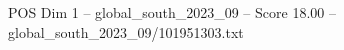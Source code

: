 \begin{textsample}{POS Dim 1 – global\_south\_2023\_09 – Score 18.00 – global\_south\_2023\_09/101951303.txt}
\end{textsample}
